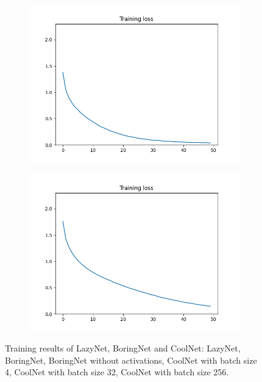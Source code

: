 \documentclass[12pt]{article}
\begin{document}
\begin{figure}
\begin{subfigure}{0.16\textwidth}
    \includegraphics[width=\linewidth]{loss_2_3_bs32.png}
    \caption{}
    \label{fig:2_3_bs32}
  \end{subfigure}
  \begin{subfigure}{0.16\textwidth}
    \centering
    \includegraphics[width=\linewidth]{loss_2_3_bs256.png}
    \caption{}
    \label{fig:2_3_bs256}
  \end{subfigure}
  \caption{Training results of LazyNet, BoringNet and CoolNet:  LazyNet,  BoringNet,  BoringNet without activations,  CoolNet with batch size 4,  CoolNet with batch size 32,  CoolNet with batch size 256.}
  \label{fig:2}
\end{figure}
\end{document}

